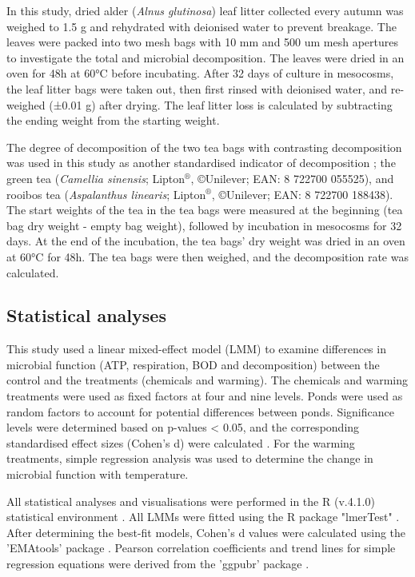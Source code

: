 \documentclass[11pt, a4paper]{article}
\begin{document}
\begin{spacing}{1.5}
In this study, dried alder (\textit{Alnus glutinosa}) leaf litter collected every autumn was weighed to 1.5 g and rehydrated with deionised water to prevent breakage. The leaves were packed into two mesh bags with 10 mm and 500 um mesh apertures to investigate the total and microbial decomposition. The leaves were dried in an oven for 48h at 60°C before incubating. After 32 days of culture in mesocosms, the leaf litter bags were taken out, then first rinsed with deionised water, and re-weighed (±0.01 g) after drying. The leaf litter loss is calculated by subtracting the ending weight from the starting weight.

The degree of decomposition of the two tea bags with contrasting decomposition was used in this study as another standardised indicator of decomposition \citep{keuskamp2013tea}; the green tea (\textit{Camellia sinensis}; Lipton$^\circledR$, \copyright Unilever; EAN: 8 722700 055525), and rooibos tea (\textit{Aspalanthus linearis}; Lipton$^\circledR$, \copyright Unilever; EAN: 8 722700 188438). The start weights of the tea in the tea bags were measured at the beginning (tea bag dry weight - empty bag weight), followed by incubation in mesocosms for 32 days. At the end of the incubation, the tea bags' dry weight was dried in an oven at 60°C for 48h. The tea bags were then weighed, and the decomposition rate was calculated.

\subsection{Statistical analyses}

This study used a linear mixed-effect model (LMM) to examine differences in microbial function (ATP, respiration, BOD and decomposition) between the control and the treatments (chemicals and warming). The chemicals and warming treatments were used as fixed factors at four and nine levels. Ponds were used as random factors to account for potential differences between ponds. Significance levels were determined based on p-values < 0.05, and the corresponding standardised effect sizes (Cohen's d) were calculated \citep{cohen2013statistical}. For the warming treatments, simple regression analysis was used to determine the change in microbial function with temperature.

All statistical analyses and visualisations were performed in the R (v.4.1.0) statistical environment \citep{ihaka1996r}. All LMMs were fitted using the R package "lmerTest" \citep{kuznetsova2017lmertest}. After determining the best-fit models, Cohen's d values were calculated using the 'EMAtools' package \citep{kleiman2017ematools}. Pearson correlation coefficients and trend lines for simple regression equations were derived from the 'ggpubr' package \citep{kassambara2020package}.


\end{spacing}
\end{document}
